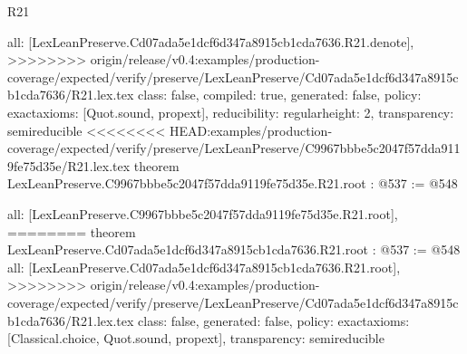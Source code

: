 \begin{lexlean}{R21}
\begin{coremodule}
{{{{{  all: [LexLeanPreserve.Cd07ada5e1dcf6d347a8915cb1cda7636.R21.denote],
>>>>>>>> origin/release/v0.4:examples/production-coverage/expected/verify/preserve/LexLeanPreserve/Cd07ada5e1dcf6d347a8915cb1cda7636/R21.lex.tex
  class: false,
  compiled: true,
  generated: false,
  policy: exact{axioms: [Quot.sound, propext]},
  reducibility: regular{height: 2},
  transparency: semireducible
}
<<<<<<<< HEAD:examples/production-coverage/expected/verify/preserve/LexLeanPreserve/C9967bbbe5c2047f57dda9119fe75d35e/R21.lex.tex
theorem LexLeanPreserve.C9967bbbe5c2047f57dda9119fe75d35e.R21.root : @537 := @548 {
  all: [LexLeanPreserve.C9967bbbe5c2047f57dda9119fe75d35e.R21.root],
========
theorem LexLeanPreserve.Cd07ada5e1dcf6d347a8915cb1cda7636.R21.root : @537 := @548 {
  all: [LexLeanPreserve.Cd07ada5e1dcf6d347a8915cb1cda7636.R21.root],
>>>>>>>> origin/release/v0.4:examples/production-coverage/expected/verify/preserve/LexLeanPreserve/Cd07ada5e1dcf6d347a8915cb1cda7636/R21.lex.tex
  class: false,
  generated: false,
  policy: exact{axioms: [Classical.choice, Quot.sound, propext]},
  transparency: semireducible
}

}}}}}
\end{coremodule}
\end{lexlean}
